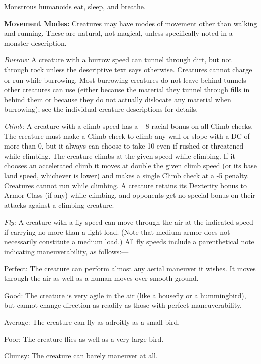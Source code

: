 \documentclass{article}
\begin{document}
Monstrous humanoids eat, sleep, and breathe.

\vspace{12pt}
\textbf{Movement Modes: }Creatures may have modes of movement other than walking 
and running. These are natural, not magical, unless specifically noted in a monster 
description.

\textit{Burrow: }A creature with a burrow speed can tunnel through dirt, but not 
through rock unless the descriptive text says otherwise. Creatures cannot charge 
or run while burrowing. Most burrowing creatures do not leave behind tunnels other 
creatures can use (either because the material they tunnel through fills in behind 
them or because they do not actually dislocate any material when burrowing); see 
the individual creature descriptions for details.

\textit{Climb: }A creature with a climb speed has a +8 racial bonus on all Climb 
checks. The creature must make a Climb check to climb any wall or slope with a 
DC of more than 0, but it always can choose to take 10 even if rushed or threatened 
while climbing. The creature climbs at the given speed while climbing. If it chooses 
an accelerated climb it moves at double the given climb speed (or its base land 
speed, whichever is lower) and makes a single Climb check at a -5 penalty. Creatures 
cannot run while climbing. A creature retains its Dexterity bonus to Armor Class 
(if any) while climbing, and opponents get no special bonus on their attacks against 
a climbing creature.

\textit{Fly: }A creature with a fly speed can move through the air at the indicated 
speed if carrying no more than a light load. (Note that medium armor does not necessarily 
constitute a medium load.) All fly speeds include a parenthetical note indicating 
maneuverability, as follows:---

Perfect: The creature can perform almost any aerial maneuver it wishes. It moves 
through the air as well as a human moves over smooth ground.---

Good: The creature is very agile in the air (like a housefly or a hummingbird), 
but cannot change direction as readily as those with perfect maneuverability.---

Average: The creature can fly as adroitly as a small bird. ---

Poor: The creature flies as well as a very large bird.---

Clumsy: The creature can barely maneuver at all.
\end{document}
